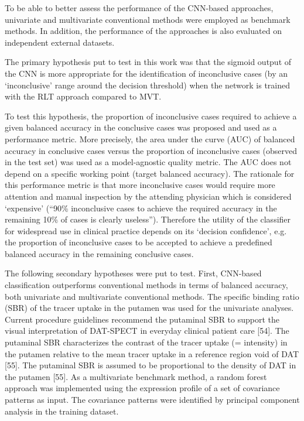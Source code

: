 To be able to better assess the performance of the CNN-based approaches, univariate and multivariate conventional methods were employed as 
benchmark methods. In addition, the performance of the approaches is also evaluated on independent external datasets.


The primary hypothesis put to test in this work was that the sigmoid output of the CNN is more appropriate for the identification of inconclusive cases 
(by an `inconclusive' range around the decision threshold) when the network is trained with the RLT approach compared to MVT.

To test this hypothesis, the proportion of inconclusive cases required to achieve a given balanced accuracy in the conclusive cases 
was proposed and used as a performance metric.
More precisely, the area under the curve (AUC) of balanced accuracy in conclusive cases versus the proportion of inconclusive cases 
(observed in the test set) was used as a model-agnostic quality metric. 
The AUC does not depend on a specific working point (target balanced accuracy).  
The rationale for this performance metric is that more inconclusive cases would require more attention and manual inspection 
by the attending physician which is considered `expensive'
(“90\% inconclusive cases to achieve the required accuracy in the remaining 10\% of cases is clearly useless”).
Therefore the utility of the classifier for widespread use in clinical practice depends on its `decision confidence', 
e.g. the proportion of inconclusive cases to be accepted to achieve a predefined balanced accuracy in the remaining conclusive cases. 

The following secondary hypotheses were put to test. First, CNN-based classification outperforms conventional methods in terms of balanced accuracy, 
both univariate and multivariate conventional methods. 
The specific binding ratio (SBR) of the tracer uptake in the putamen was used for the univariate analyses. 
Current procedure guidelines recommend the putaminal SBR to support the visual interpretation of DAT-SPECT in everyday clinical patient care [54]. 
The putaminal SBR characterizes the contrast of the tracer uptake (= intensity) in the putamen relative to the mean tracer uptake in a reference 
region void of DAT [55]. 
The putaminal SBR is assumed to be proportional to the density of DAT in the putamen [55]. 
As a multivariate benchmark method, a random forest approach was implemented using the expression profile of a set of covariance patterns as input. 
The covariance patterns were identified by principal component analysis in the training dataset. 


